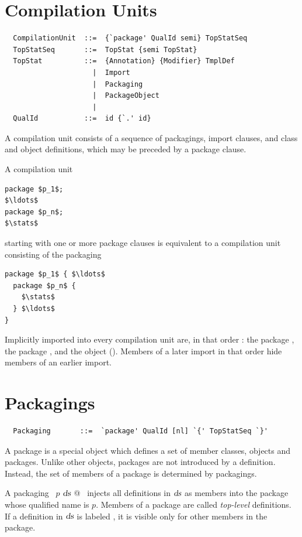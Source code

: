 \section{Compilation Units}

\syntax\begin{lstlisting}
  CompilationUnit  ::=  {`package' QualId semi} TopStatSeq
  TopStatSeq       ::=  TopStat {semi TopStat}
  TopStat          ::=  {Annotation} {Modifier} TmplDef
                     |  Import
                     |  Packaging
                     |  PackageObject
                     |
  QualId           ::=  id {`.' id}
\end{lstlisting}

A compilation unit consists of a sequence of packagings, import
clauses, and class and object definitions, which may be preceded by a
package clause.

A compilation unit 
\begin{lstlisting}
package $p_1$;
$\ldots$
package $p_n$;
$\stats$
\end{lstlisting}
starting with one or more package
clauses is equivalent to a compilation unit consisting of the
packaging 
\begin{lstlisting}
package $p_1$ { $\ldots$
  package $p_n$ {
    $\stats$
  } $\ldots$
}
\end{lstlisting}

Implicitly imported into every compilation unit are, in that order :
the package , the package , and the object
 (). Members of a later import in
that order hide members of an earlier import.

\section{Packagings}\label{sec:packagings}

\syntax\begin{lstlisting}
  Packaging       ::=  `package' QualId [nl] `{' TopStatSeq `}'
\end{lstlisting}

A package is a special object which defines a set of member classes,
objects and packages.  Unlike other objects, packages are not introduced
by a definition.  Instead, the set of members of a package is determined by
packagings.

A packaging ~\lstinline@package $p$ { $\mbox{\sl ds}$ }@~ injects all
definitions in $\mbox{\sl ds}$ as members into the package whose qualified name
is $p$. Members of a package are called {\em top-level} definitions.
If a definition in $\mbox{\sl ds}$ is labeled , it is
visible only for other members in the package.

